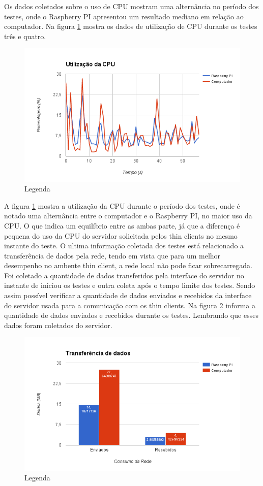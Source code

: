 \documentclass[
	12pt,				%
	openright,			%
	twoside,			%
	a4paper,			%
	chapter=TITLE,		%
	english,			%
	brazil				%
	]{abntex2}
\begin{document}
Os dados coletados sobre o  uso de CPU mostram uma alternância no período dos testes, onde o Raspberry PI apresentou um resultado mediano em relação ao computador. Na figura \ref{fig:cpu} mostra os dados de utilização de CPU durante os testes três e quatro.

\begin{figure}[!htb]
\centering
\includegraphics[scale=0.8]{Imagens/cpu}
\caption{Legenda}
\label{fig:cpu}
\end{figure}

A figura \ref{fig:cpu} mostra a utilização da CPU durante o período dos testes, onde é notado  uma alternância entre o computador e o Raspberry PI, no maior uso da CPU. O que indica um equilíbrio entre as ambas parte, já que a diferença é pequena do uso da CPU do servidor solicitada pelos thin clients  no mesmo instante do teste.
O ultima informação coletada dos testes está relacionado a transferência de dados pela rede, tendo em vista que para um melhor desempenho no ambente thin client, a rede local não pode ficar sobrecarregada. Foi coletado a quantidade de dados transferidos pela interface do servidor no instante de iniciou os testes e outra coleta após o tempo limite dos testes. Sendo assim possível verificar a quantidade de dados enviados e recebidos da interface do servidor usada para a comunicação com os thin clients.
Na figura \ref{fig:net} informa a quantidade de dados enviados e recebidos durante os testes. Lembrando que esses dados foram coletados do servidor.

\begin{figure}[!htb]
\centering
\includegraphics[scale=0.8]{Imagens/net}
\caption{Legenda}
\label{fig:net}
\end{figure}
\end{document}
